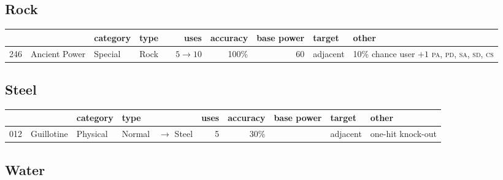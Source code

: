 \documentclass{article}
\newcommand{\pa}{\textsc{pa}}
\newcommand{\pd}{\textsc{pd}}
\newcommand{\sa}{\textsc{sa}}
\newcommand{\sd}{\textsc{sd}}
\newcommand{\cs}{\textsc{cs}}
\begin{document}
\begin{landscape}
\normalsize
\subsection{Rock}
\small
\begin{longtable}{rl|l|ll|rrr|l|l}
 &  & category & type &  & uses & accuracy & base power & target & other \\
\hline
246 & Ancient Power & Special & Rock &  & $5 \rightarrow 10$ & 100\% & 60 & adjacent & 10\% chance user $+1$ \pa, \pd, \sa, \sd, \cs \\
\end{longtable}

\normalsize
\subsection{Steel}
\small
\begin{longtable}{rl|l|ll|rrr|l|l}
 &  & category & type &  & uses & accuracy & base power & target & other \\
\hline
012 & Guillotine & Physical & Normal & $\rightarrow$ Steel & 5 & 30\% &  & adjacent & one-hit knock-out \\
\end{longtable}

\normalsize
\subsection{Water}

\end{landscape}
\end{document}
